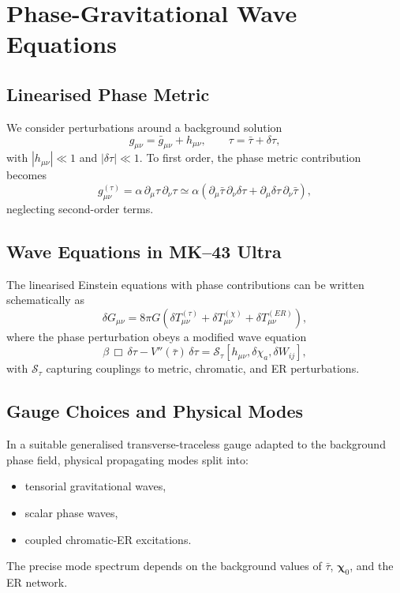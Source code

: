 \chapter{Phase-Gravitational Wave Equations}

\section{Linearised Phase Metric}

We consider perturbations around a background solution
\[
g_{\mu\nu} = \bar{g}_{\mu\nu} + h_{\mu\nu},\qquad
\tau = \bar{\tau} + \delta\tau,
\]
with $|h_{\mu\nu}|\ll 1$ and $|\delta\tau|\ll 1$.
To first order, the phase metric contribution becomes
\[
g^{(\tau)}_{\mu\nu}
=
\alpha\, \partial_\mu \tau\, \partial_\nu\tau
\simeq
\alpha\left(
\partial_\mu \bar{\tau}\, \partial_\nu \delta\tau
+
\partial_\mu \delta\tau\, \partial_\nu \bar{\tau}
\right),
\]
neglecting second-order terms.

\section{Wave Equations in MK--43 Ultra}

The linearised Einstein equations with phase contributions can be written schematically as
\[
\delta G_{\mu\nu}
=
8\pi G\left(
\delta T_{\mu\nu}^{(\tau)}
+
\delta T_{\mu\nu}^{(\chi)}
+
\delta T_{\mu\nu}^{(ER)}
\right),
\]
where the phase perturbation obeys a modified wave equation
\[
\beta\, \Box\, \delta\tau
- V''(\bar{\tau})\, \delta\tau
=
\mathcal{S}_{\tau}[h_{\mu\nu},\delta\chi_a,\delta W_{ij}],
\]
with $\mathcal{S}_{\tau}$ capturing couplings to metric, chromatic, and ER perturbations.

\section{Gauge Choices and Physical Modes}

In a suitable generalised transverse-traceless gauge adapted to the background phase field, physical propagating modes split into:
\begin{itemize}
  \item tensorial gravitational waves,
  \item scalar phase waves,
  \item coupled chromatic-ER excitations.
\end{itemize}
The precise mode spectrum depends on the background values of $\bar{\tau}$, $\bm{\chi}_0$, and the ER network.

